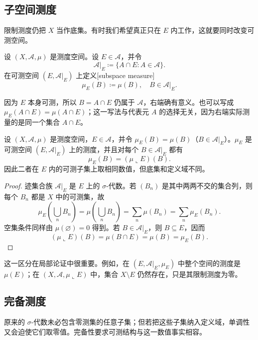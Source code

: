 \subsection{子空间测度}
\label{b1:subsec:020202}

限制测度仍把 \(X\) 当作底集。有时我们希望真正只在 \(E\) 内工作，这就要同时改变可测空间。

\begin{definition}
\label{b1:def:subspace-measure}
设 \((X,\mathcal A,\mu)\) 是测度空间。设 \(E\in\mathcal A\)，并令
\[
\mathcal A|_E\coloneqq\{A\cap E:A\in\mathcal A\}.
\]
在可测空间 \((E,\mathcal A|_E)\) 上定义[subspace measure]
\[
\mu_E(B)\coloneqq\mu(B),
\quad B\in\mathcal A|_E.
\]
\end{definition}

因为 \(E\) 本身可测，所以 \(B=A\cap E\) 仍属于 \(\mathcal A\)，右端确有意义。也可以写成 \(\mu_E(A\cap E)=\mu(A\cap E)\)；这一写法与代表元 \(A\) 的选择无关，因为右端实际测量的是同一个集合 \(A\cap E\)。

\begin{proposition}
\label{b1:prop:subspace-measure}
设 \((X,\mathcal A,\mu)\) 是测度空间，\(E\in\mathcal A\)，并令 \(\mu_E(B)=\mu(B)\)（\(B\in\mathcal A|_E\)）。\(\mu_E\) 是可测空间 \((E,\mathcal A|_E)\) 上的测度，并且对每个 \(B\in\mathcal A|_E\) 都有
\[
\mu_E(B)=(\mu\llcorner E)(B).
\]
因此二者在 \(E\) 内的可测子集上取相同数值，但底集和定义域不同。
\end{proposition}
\begin{proof}
迹集合族 \(\mathcal A|_E\) 是 \(E\) 上的 \(\sigma\)-代数。若 \((B_n)\) 是其中两两不交的集合列，则每个 \(B_n\) 都是 \(X\) 中的可测集，故
\[
\mu_E\left(\bigcup_nB_n\right)
=\mu\left(\bigcup_nB_n\right)
=\sum_n\mu(B_n)
=\sum_n\mu_E(B_n).
\]
空集条件同样由 \(\mu(\varnothing)=0\) 得到。若 \(B\in\mathcal A|_E\)，则 \(B\subseteq E\)，因而
\[
(\mu\llcorner E)(B)=\mu(B\cap E)=\mu(B)=\mu_E(B).
\]
\end{proof}

这一区分在局部论证中很重要。例如，在 \((E,\mathcal A|_E,\mu_E)\) 中整个空间的测度是 \(\mu(E)\)；在 \((X,\mathcal A,\mu\llcorner E)\) 中，集合 \(X\setminus E\) 仍然存在，只是其限制测度为零。

\subsection{完备测度}
\label{b1:subsec:020203}

原来的 \(\sigma\)-代数未必包含零测集的任意子集；但若把这些子集纳入定义域，单调性又会迫使它们取零值。完备性要求可测结构与这一数值事实相容。

